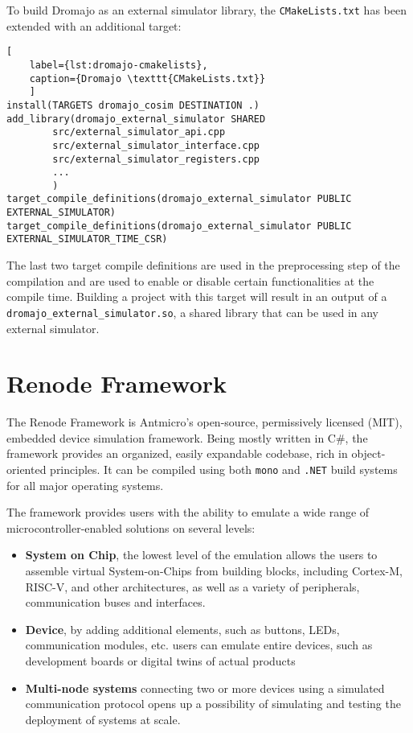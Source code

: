 To build Dromajo as an external simulator library, the \texttt{CMakeLists.txt} has been extended with an additional
target:

\begin{lstlisting}[
    label={lst:dromajo-cmakelists},
    caption={Dromajo \texttt{CMakeLists.txt}}
    ]
install(TARGETS dromajo_cosim DESTINATION .)
add_library(dromajo_external_simulator SHARED
        src/external_simulator_api.cpp
        src/external_simulator_interface.cpp
        src/external_simulator_registers.cpp
        ...
        )
target_compile_definitions(dromajo_external_simulator PUBLIC EXTERNAL_SIMULATOR)
target_compile_definitions(dromajo_external_simulator PUBLIC EXTERNAL_SIMULATOR_TIME_CSR)
\end{lstlisting}

\noindent
The last two target compile definitions are used in the preprocessing step of the compilation and are used to enable
or disable certain functionalities at the compile time. Building a project with this target will result in an output
of a \texttt{dromajo\_external\_simulator.so}, a shared library that can be used in any external simulator.

\pagebreak

\section{Renode Framework}
The Renode Framework is Antmicro's open-source, permissively licensed (MIT), embedded device simulation framework.
Being mostly written in C\#, the framework provides an organized, easily expandable codebase, rich in
object-oriented principles. It can be compiled using both \texttt{mono} and \texttt{.NET} build systems for
all major operating systems.

The framework provides users with the ability to emulate a wide range of microcontroller-enabled solutions on several levels:
\begin{itemize}
    \item{\textbf{System on Chip}, the lowest level of the emulation allows the users to assemble virtual System-on-Chips from building blocks,
    including Cortex-M, RISC-V, and other architectures, as well as a variety of peripherals, communication buses and interfaces.}
    \item{\textbf{Device}, by adding additional elements, such as buttons, LEDs, communication modules, etc. users can
    emulate entire devices, such as development boards or digital twins of actual products}
    \item{\textbf{Multi-node systems} connecting two or more devices using a simulated communication protocol opens
    up a possibility of simulating and testing the deployment of systems at scale.}
\end{itemize}

